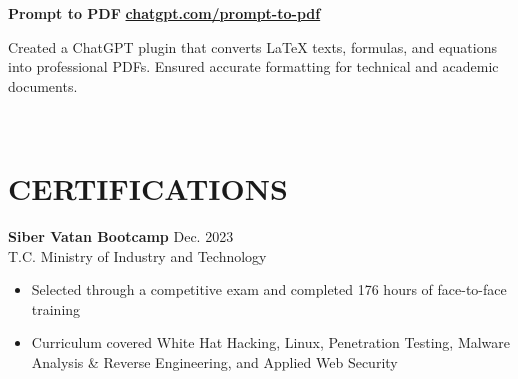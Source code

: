 \documentclass[11pt]{article}       %
\begin{document}
\textbf{Prompt to PDF} \hfill 
\href{https://chatgpt.com/g/g-6790c6ff33988191a78371fbc1267981-prompt-to-pdf}{\textbf{chatgpt.com/prompt-to-pdf}} \\[3pt]
\begin{minipage}{0.75\textwidth}
Created a ChatGPT plugin that converts LaTeX texts, formulas, and equations into professional PDFs. 
Ensured accurate formatting for technical and academic documents.
\end{minipage} \\[6pt]







\section*{CERTIFICATIONS}
\textbf{Siber Vatan Bootcamp} \hfill Dec. 2023 \\
T.C. Ministry of Industry and Technology \\
\vspace{-9pt}
\begin{itemize}
  \item Selected through a competitive exam and completed 176 hours of face-to-face training
  \item Curriculum covered White Hat Hacking, Linux, Penetration Testing, Malware Analysis \& Reverse Engineering, and Applied Web Security
\end{itemize}



\end{document}
